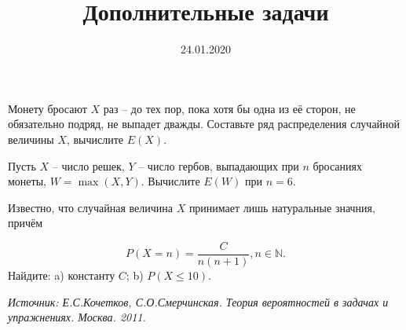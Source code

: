 \documentclass[a4paper, 12pt]{article}
\title{Дополнительные задачи}
\date{24.01.2020}
\begin{document}
\begin{problem}
Монету бросают $X$ раз -- до тех пор, пока хотя бы одна из её 
сторон, не обязательно подряд, не выпадет дважды. 
Составьте ряд распределения случайной величины $X$, 
вычислите $E(X)$.
\end{problem}

\begin{problem}
Пусть $X$ -- число решек, $Y$ -- число гербов, выпадающих при 
$n$ бросаниях монеты, $W = \max(X,Y)$. Вычислите $E(W)$ при $n=6$.
\end{problem}

\begin{problem}
Известно, что случайная величина $X$ принимает лишь натуральные значния, 
причём 

$$
P(X=n) = \frac{C}{n(n+1)}, n \in \mathbb{N}.
$$
Найдите: a) константу $C$; b) $P(X\leqslant10)$.
\end{problem}

\noindent\textit{Источник: Е.С.Кочетков, С.О.Смерчинская. 
Теория вероятностей в задачах и упражнениях. Москва. 2011.
}
\end{document}

